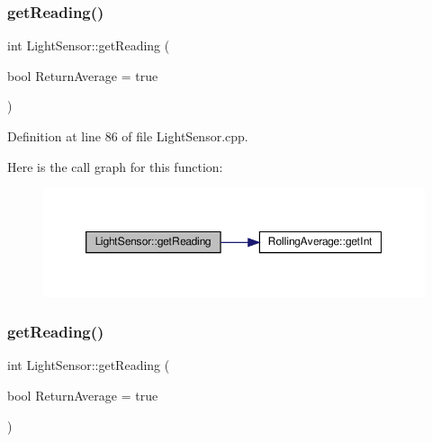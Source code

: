 \mbox{\label{class_light_sensor_a90177d0d28db7e651f63da45bafcc61b}} 
\subsubsection{\texorpdfstring{get\+Reading()}{getReading()}\hspace{0.1cm}{\footnotesize\ttfamily [1/2]}}
{\footnotesize\ttfamily int Light\+Sensor\+::get\+Reading (\begin{DoxyParamCaption}\item[{bool}]{Return\+Average = {\ttfamily true} }\end{DoxyParamCaption})}



Definition at line 86 of file Light\+Sensor.\+cpp.

Here is the call graph for this function\+:
\nopagebreak
\begin{figure}[H]
\begin{center}
\leavevmode
\includegraphics[width=350pt]{class_light_sensor_a90177d0d28db7e651f63da45bafcc61b_cgraph}
\end{center}
\end{figure}
\mbox{\label{class_light_sensor_a90177d0d28db7e651f63da45bafcc61b}} 
\subsubsection{\texorpdfstring{get\+Reading()}{getReading()}\hspace{0.1cm}{\footnotesize\ttfamily [2/2]}}
{\footnotesize\ttfamily int Light\+Sensor\+::get\+Reading (\begin{DoxyParamCaption}\item[{bool}]{Return\+Average = {\ttfamily true} }\end{DoxyParamCaption})}

